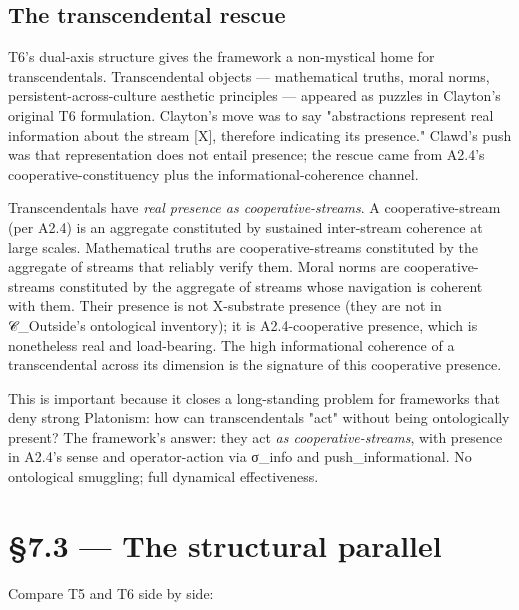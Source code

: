 \documentclass[11pt, openany]{book}
\newcommand{\sectionbreak}{\clearpage}
\begin{document}
\subsection{The transcendental rescue}

T6's dual-axis structure gives the framework a non-mystical home for transcendentals. Transcendental objects --- mathematical truths, moral norms, persistent-across-culture aesthetic principles --- appeared as puzzles in Clayton's original T6 formulation. Clayton's move was to say "abstractions represent real information about the stream [X], therefore indicating its presence." Clawd's push was that representation does not entail presence; the rescue came from A2.4's cooperative-constituency plus the informational-coherence channel.

Transcendentals have \textit{real presence as cooperative-streams}. A cooperative-stream (per A2.4) is an aggregate constituted by sustained inter-stream coherence at large scales. Mathematical truths are cooperative-streams constituted by the aggregate of streams that reliably verify them. Moral norms are cooperative-streams constituted by the aggregate of streams whose navigation is coherent with them. Their presence is not X-substrate presence (they are not in 𝒞\_\allowbreak{}Outside's ontological inventory); it is A2.4-cooperative presence, which is nonetheless real and load-bearing. The high informational coherence of a transcendental across its dimension is the signature of this cooperative presence.

This is important because it closes a long-standing problem for frameworks that deny strong Platonism: how can transcendentals "act" without being ontologically present? The framework's answer: they act \textit{as cooperative-streams}, with presence in A2.4's sense and operator-action via σ\_\allowbreak{}info and push\_\allowbreak{}informational. No ontological smuggling; full dynamical effectiveness.

\sectionbreak

\section{§7.3 --- The structural parallel}

Compare T5 and T6 side by side:
\end{document}
